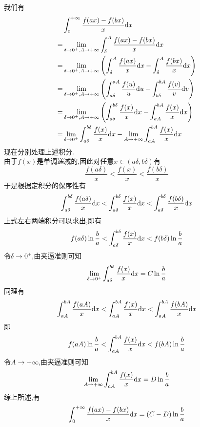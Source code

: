 \documentclass{ctexart}
\begin{document}
\begin{solution}
    我们有
    \[\begin{aligned}
        &\int_0^{+\infty}\dfrac{f(ax)-f(bx)}{x}\mathrm{d} x\\
        =&\lim_{\delta\to0^+,A\to+\infty}\int_{\delta}^{A}\dfrac{f(ax)-f(bx)}{x}\mathrm{d} x \\
        =&\lim_{\delta\to0^+,A\to+\infty}\left(\int_{\delta}^{A}\dfrac{f(ax)}{x}\mathrm{d} x-\int_{\delta}^{A}\dfrac{f(bx)}{x}\mathrm{d} x\right) \\
        =&\lim_{\delta\to0^+,A\to+\infty}\left(\int_{a\delta}^{aA}\dfrac{f(u)}{u}\mathrm{d} u-\int_{b\delta}^{bA}\dfrac{f(v)}{v}\mathrm{d} v\right) \\
        =&\lim_{\delta\to0^+,A\to+\infty}\left(\int_{a\delta}^{b\delta}\dfrac{f(x)}{x}\mathrm{d} x-\int_{aA}^{bA}\dfrac{f(x)}{x}\mathrm{d} x\right) \\
        =&\lim_{\delta\to0^+}\int_{a\delta}^{b\delta}\dfrac{f(x)}{x}\mathrm{d} x-\lim_{A\to+\infty}\int_{aA}^{bA}\dfrac{f(x)}{x}\mathrm{d} x
    \end{aligned}\]
    现在分别处理上述积分.\\
    由于$f(x)$是单调递减的,因此对任意$x\in(a\delta,b\delta)$有
    \[\dfrac{f(a\delta)}{x}<\dfrac{f(x)}{x}<\dfrac{f(b\delta)}{x}\]
    于是根据定积分的保序性有
    \[\int_{a\delta}^{b\delta}\dfrac{f(a\delta)}{x}\mathrm{d} x<\int_{a\delta}^{b\delta}\dfrac{f(x)}{x}\mathrm{d} x<\int_{a\delta}^{b\delta}\dfrac{f(b\delta)}{x}\mathrm{d} x\]
    上式左右两端积分可以求出,即有
    \[f(a\delta)\ln\dfrac{b}{a}<\int_{a\delta}^{b\delta}\dfrac{f(x)}{x}\mathrm{d} x<f(b\delta)\ln\dfrac{b}{a}\]
    令$\delta\to0^+$,由夹逼准则可知
    \[\lim_{\delta\to0^+}\int_{a\delta}^{b\delta}\dfrac{f(x)}{x}\mathrm{d} x=C\ln\dfrac ba\]
    同理有
    \[\int_{aA}^{bA}\dfrac{f(aA)}{x}\mathrm{d} x<\int_{aA}^{bA}\dfrac{f(x)}{x}\mathrm{d} x<\int_{aA}^{bA}\dfrac{f(bA)}{x}\mathrm{d} x\]
    即
    \[f(aA)\ln\dfrac{b}{a}<\int_{aA}^{bA}\dfrac{f(x)}{x}\mathrm{d} x<f(bA)\ln\dfrac{b}{a}\]
    令$A\to+\infty$,由夹逼准则可知
    \[\lim_{A\to+\infty}\int_{aA}^{bA}\dfrac{f(x)}{x}\mathrm{d} x=D\ln\dfrac ba\]
    综上所述,有
    \[\int_0^{+\infty}\dfrac{f(ax)-f(bx)}{x}\mathrm{d} x=(C-D)\ln\dfrac ba\]
\end{solution}
\end{document}
